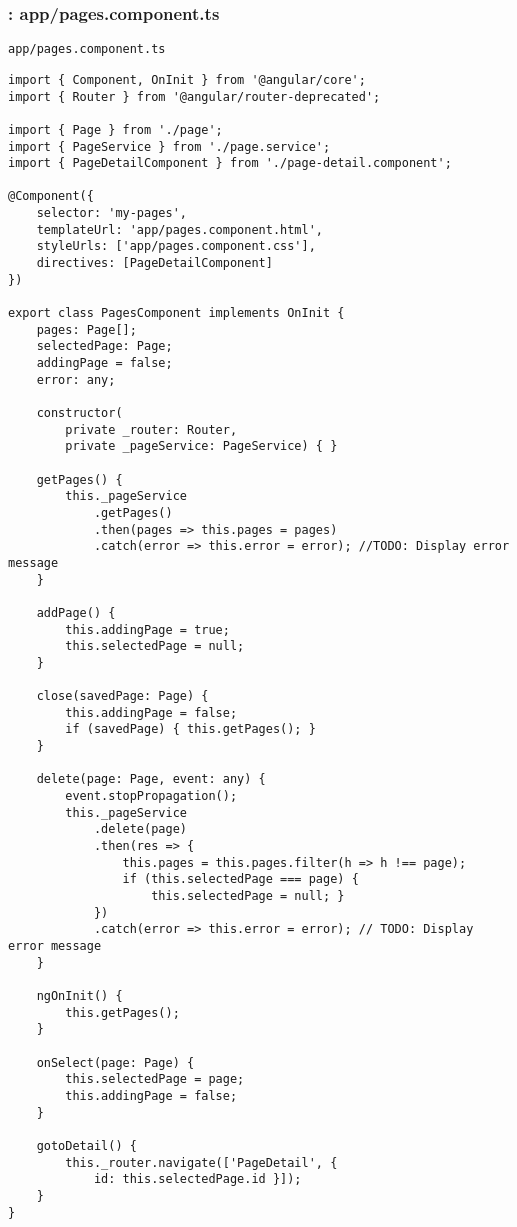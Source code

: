 \documentclass[11pt]{article}
\begin{document}
\subsubsection{: app/pages.component.ts}
\label{sec-2-5-2}
\begin{verbatim}
app/pages.component.ts
\end{verbatim}
\begin{verbatim}
import { Component, OnInit } from '@angular/core';
import { Router } from '@angular/router-deprecated';

import { Page } from './page';
import { PageService } from './page.service';
import { PageDetailComponent } from './page-detail.component';

@Component({
    selector: 'my-pages',
    templateUrl: 'app/pages.component.html',
    styleUrls: ['app/pages.component.css'],
    directives: [PageDetailComponent]
})

export class PagesComponent implements OnInit {
    pages: Page[]; 
    selectedPage: Page;
    addingPage = false;
    error: any;

    constructor(
        private _router: Router,
        private _pageService: PageService) { }

    getPages() {
        this._pageService
            .getPages()
            .then(pages => this.pages = pages)
            .catch(error => this.error = error); //TODO: Display error message
    }

    addPage() {
        this.addingPage = true;
        this.selectedPage = null;
    }

    close(savedPage: Page) {
        this.addingPage = false;
        if (savedPage) { this.getPages(); }
    }

    delete(page: Page, event: any) {
        event.stopPropagation();
        this._pageService
            .delete(page)
            .then(res => {
                this.pages = this.pages.filter(h => h !== page);
                if (this.selectedPage === page) {
                    this.selectedPage = null; }
            })
            .catch(error => this.error = error); // TODO: Display error message
    }

    ngOnInit() {
        this.getPages();
    }

    onSelect(page: Page) {
        this.selectedPage = page;
        this.addingPage = false;
    }

    gotoDetail() {
        this._router.navigate(['PageDetail', {
            id: this.selectedPage.id }]);
    }
}
\end{verbatim}
\end{document}
